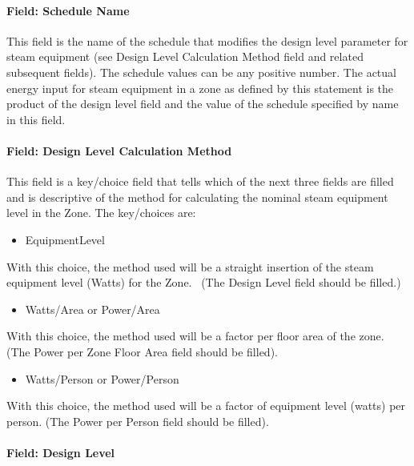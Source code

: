 \paragraph{Field: Schedule Name}\label{field-schedule-name-4-000}

This field is the name of the schedule that modifies the design level parameter for steam equipment (see Design Level Calculation Method field and related subsequent fields). The schedule values can be any positive number. The actual energy input for steam equipment in a zone as defined by this statement is the product of the design level field and the value of the schedule specified by name in this field.

\paragraph{Field: Design Level Calculation Method}\label{field-design-level-calculation-method-4}

This field is a key/choice field that tells which of the next three fields are filled and is descriptive of the method for calculating the nominal steam equipment level in the Zone. The key/choices are:

\begin{itemize}
\tightlist
\item
  EquipmentLevel
\end{itemize}

With this choice, the method used will be a straight insertion of the steam equipment level (Watts) for the Zone.~ (The Design Level field should be filled.)

\begin{itemize}
\tightlist
\item
  Watts/Area or Power/Area
\end{itemize}

With this choice, the method used will be a factor per floor area of the zone. (The Power per Zone Floor Area field should be filled).

\begin{itemize}
\tightlist
\item
  Watts/Person or Power/Person
\end{itemize}

With this choice, the method used will be a factor of equipment level (watts) per person. (The Power per Person field should be filled).

\paragraph{Field: Design Level}\label{field-design-level-3}

